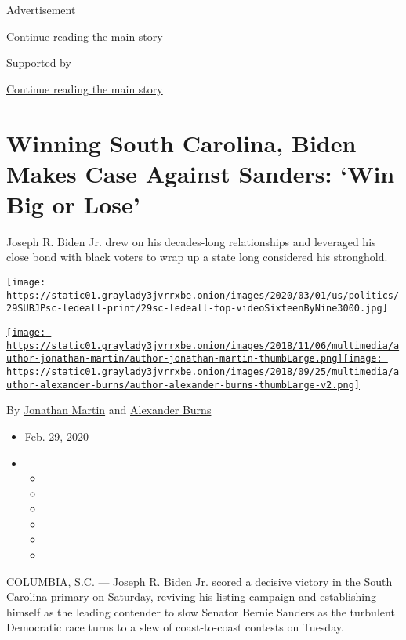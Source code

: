 Advertisement

\protect\hyperlink{after-top}{Continue reading the main story}

Supported by

\protect\hyperlink{after-sponsor}{Continue reading the main story}

\hypertarget{winning-south-carolina-biden-makes-case-against-sanders-win-big-or-lose}{%
\section{Winning South Carolina, Biden Makes Case Against Sanders: `Win
Big or
Lose'}\label{winning-south-carolina-biden-makes-case-against-sanders-win-big-or-lose}}

Joseph R. Biden Jr. drew on his decades-long relationships and leveraged
his close bond with black voters to wrap up a state long considered his
stronghold.

\texttt{[image: https://static01.graylady3jvrrxbe.onion/images/2020/03/01/us/politics/29SUBJPsc-ledeall-print/29sc-ledeall-top-videoSixteenByNine3000.jpg]}

\href{https://www.nytimes3xbfgragh.onion/by/jonathan-martin}{\texttt{[image: https://static01.graylady3jvrrxbe.onion/images/2018/11/06/multimedia/author-jonathan-martin/author-jonathan-martin-thumbLarge.png]}}\href{https://www.nytimes3xbfgragh.onion/by/alexander-burns}{\texttt{[image: https://static01.graylady3jvrrxbe.onion/images/2018/09/25/multimedia/author-alexander-burns/author-alexander-burns-thumbLarge-v2.png]}}

By \href{https://www.nytimes3xbfgragh.onion/by/jonathan-martin}{Jonathan
Martin} and
\href{https://www.nytimes3xbfgragh.onion/by/alexander-burns}{Alexander
Burns}

\begin{itemize}
\item
  Feb. 29, 2020
\item
  \begin{itemize}
  \item
  \item
  \item
  \item
  \item
  \item
  \end{itemize}
\end{itemize}

COLUMBIA, S.C. --- Joseph R. Biden Jr. scored a decisive victory in
\href{https://www.nytimes3xbfgragh.onion/live/2020/south-carolina-primary-02-29}{the
South Carolina primary} on Saturday, reviving his listing campaign and
establishing himself as the leading contender to slow Senator Bernie
Sanders as the turbulent Democratic race turns to a slew of
coast-to-coast contests on Tuesday.

